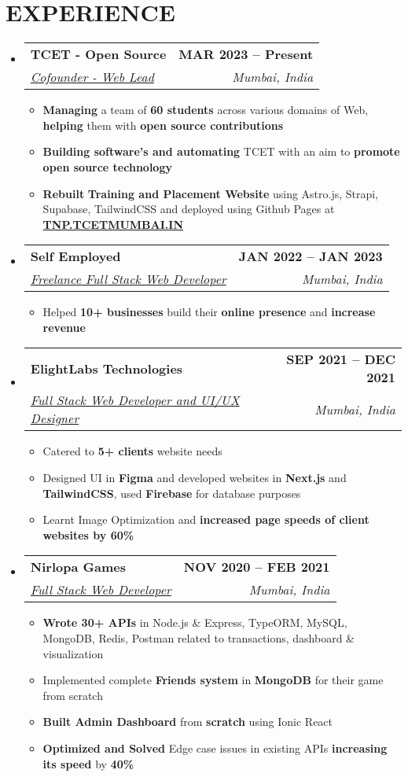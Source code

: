 \documentclass{article}
\makeatletter
\newcommand{\resumeItem}[1]{
  \item\small{
    {#1 \vspace{-2pt}}
  }
}
\newcommand{\resumeSubheading}[4]{
  \vspace{-2pt}\item
    \begin{tabular*}{1.0\textwidth}[t]{l@{\extracolsep{\fill}}r}
      \textbf{\large#1} & \textbf{\small #2} \\
      \textit{\large#3} & \textit{\small #4} \\
      
    \end{tabular*}\vspace{-7pt}
}
\newcommand{\resumeSubHeadingListStart}{\begin{itemize}[leftmargin=0.0in, label={}]}
\newcommand{\resumeSubHeadingListEnd}{\end{itemize}}
\newcommand{\resumeItemListStart}{\begin{itemize}}
\newcommand{\resumeItemListEnd}{\end{itemize}\vspace{-5pt}}
\makeatother
\begin{document}
\section{EXPERIENCE}
  \resumeSubHeadingListStart

    \resumeSubheading
      {TCET - Open Source \href{https://opensource.tcetmumbai.in/}{\raisebox{-0.1\height}\faExternalLink }  \href{https://github.com/tcet-opensource/}{\raisebox{-0.1\height}\faGithub}}{MAR 2023 -- Present} 
      {\underline{Cofounder - Web Lead}}{Mumbai, India}
      \resumeItemListStart
        \resumeItem{\normalsize{\textbf{Managing} a team of \textbf{60 students} across various domains of Web, \textbf{helping} them with \textbf{open source contributions}}}\resumeItem{\normalsize{\textbf{Building software's and automating} TCET with an aim to \textbf{promote open source technology}  }}
        \resumeItem{\normalsize{\textbf{Rebuilt} \textbf{Training and Placement Website} using Astro.js, Strapi, Supabase, TailwindCSS and deployed using Github Pages at \href{https://tnp.tcetmumbai.in}{\textbf{TNP.TCETMUMBAI.IN}}  }}
  
      \resumeItemListEnd
    \resumeSubheading
      {Self Employed \href{certificate Link}{\raisebox{-0.1\height}}}{JAN 2022 -- JAN 2023} 
      {\underline{Freelance Full Stack Web Developer}}{Mumbai, India}
      \resumeItemListStart
        \resumeItem{\normalsize{Helped \textbf{10+ businesses} build their \textbf{online presence} and \textbf{increase revenue} }}
  
      \resumeItemListEnd
    \resumeSubheading
      {ElightLabs Technologies \href{https://elightlabs.com/}{\raisebox{-0.1\height}\faExternalLink}}{SEP 2021 -- DEC 2021} 
      {\underline{Full Stack Web Developer and UI/UX Designer}}{Mumbai, India}
      \resumeItemListStart
        \resumeItem{\normalsize{Catered to \textbf{5+ clients} website needs }}
         \resumeItem{\normalsize{Designed UI in \textbf{Figma} and developed websites in \textbf{Next.js} and \textbf{TailwindCSS}, used \textbf{Firebase} for database purposes }}
         \resumeItem{\normalsize{Learnt Image Optimization and \textbf{increased page speeds of client websites by 60\%}}}
      \resumeItemListEnd
  \resumeSubheading
      {Nirlopa Games \href{https://nirlopagames.com/}{\raisebox{-0.1\height}\faExternalLink}}{NOV 2020 -- FEB 2021} 
      {\underline{Full Stack Web Developer}}{Mumbai, India}
      \resumeItemListStart
        \resumeItem{\normalsize{\textbf{Wrote 30+ APIs }in Node.js & Express, TypeORM,          MySQL, MongoDB, Redis, Postman related to transactions, dashboard &         visualization}}
         \resumeItem{\normalsize{Implemented complete \textbf{Friends system} in \textbf{MongoDB} for their game from scratch }}
         \resumeItem{\normalsize{\textbf{Built Admin Dashboard} from \textbf{scratch} using Ionic React}}
         \resumeItem{\normalsize{ \textbf{Optimized and Solved }Edge case issues in existing APIs \textbf{increasing its speed} by \textbf{40\%} }}
      \resumeItemListEnd
  \resumeSubHeadingListEnd
\vspace{-12pt}
\end{document}
